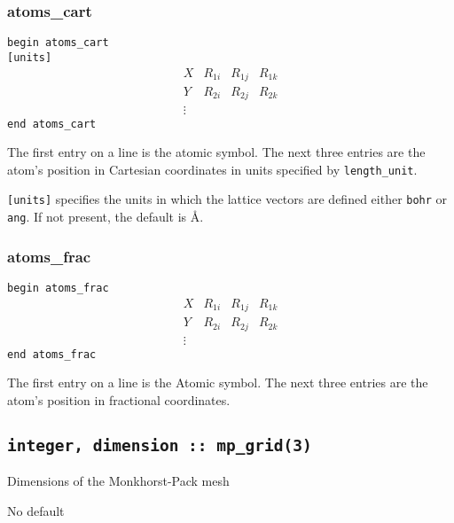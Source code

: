 \subsubsection{atoms\_cart}

\noindent \verb#begin atoms_cart# \\
\verb#[units]#
$$
\begin{array}{cccc}
X  & R_{1i} & R_{1j} & R_{1k} \\
Y  & R_{2i} & R_{2j} & R_{2k} \\
\vdots
\end{array}
$$
\verb#end atoms_cart#


The first entry on a line is the atomic symbol. The next three entries
are the atom's position in Cartesian coordinates in units specified by
\verb#length_unit#.

\verb#[units]# specifies the units in which the lattice vectors are
defined either \verb#bohr# or \verb#ang#. If not present, the default is \AA.

\subsubsection{atoms\_frac}

\noindent \verb#begin atoms_frac#
$$
\begin{array}{cccc}
X  & R_{1i} & R_{1j} & R_{1k} \\
Y  & R_{2i} & R_{2j} & R_{2k} \\
\vdots
\end{array}
$$
\verb#end atoms_frac#

The first entry on a line is the Atomic symbol. The next three entries
are the atom's position in fractional coordinates.


\subsection[mp\_grid]{\tt integer, dimension :: mp\_grid(3)}
Dimensions of the Monkhorst-Pack mesh

No default


%
%
%
%
%

